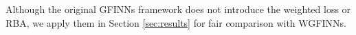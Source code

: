 \documentclass[final]{siamltex}
\newcommand{\bfa}[1]{\boldsymbol{#1}}
\begin{document}





Although the original GFINNs framework \cite{zhang2022gfinns} does not introduce the weighted loss or RBA, we apply them in Section \ref{sec:results} for fair comparison with WGFINNs. 



\end{document}
